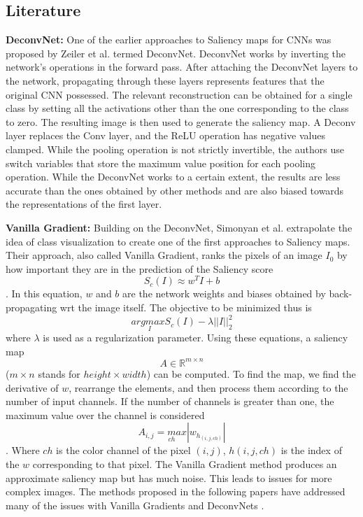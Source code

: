 \subsection{Literature}
\textbf{DeconvNet: }
One of the earlier approaches to Saliency maps for CNNs was proposed by Zeiler et al. \cite{zeilerVisualizingUnderstandingConvolutional2013} termed DeconvNet. DeconvNet works by inverting the network's operations in the forward pass. After attaching the DeconvNet layers to the network, propagating through these layers represents features that the original CNN possessed. The relevant reconstruction can be obtained for a single class by setting all the activations other than the one corresponding to the class to zero. The resulting image is then used to generate the saliency map. A Deconv layer replaces the Conv layer, and the ReLU operation has negative values clamped. While the pooling operation is not strictly invertible, the authors use switch variables that store the maximum value position for each pooling operation. While the DeconvNet works to a certain extent, the results are less accurate than the ones obtained by other methods and are also biased towards the representations of the first layer.

\textbf{Vanilla Gradient: }
Building on the DeconvNet, Simonyan et al. \cite{simonyanDeepConvolutionalNetworks2014} extrapolate the idea of class visualization to create one of the first approaches to Saliency maps. Their approach, also called Vanilla Gradient, ranks the pixels of an image $I_{0}$ by how important they are in the prediction of the Saliency score $$S_{c}(I) \approx w^{T}I + b$$. In this equation, $w$ and $b$ are the network weights and biases obtained by back-propagating wrt the image itself. The objective to be minimized thus is $$arg \underset{I}max S_{c}(I) - \lambda||I||^{2}_{2}$$ where $\lambda$ is used as a regularization parameter. Using these equations, a saliency map $$A \in \mathbb{R}^{m \times n}$$ ($m \times n$ stands for $height \times width$) can be computed. To find the map, we find the derivative of $w$, rearrange the elements, and then process them according to the number of input channels. If the number of channels is greater than one, the maximum value over the channel is considered $$A_{i,j}= \underset{ch}max |w_{h_{(i,j, ch)}}|$$. Where $ch$ is the color channel of the pixel $(i,j)$, $h(i,j, ch)$ is the index of the $w$ corresponding to that pixel. The Vanilla Gradient method produces an approximate saliency map but has much noise. This leads to issues for more complex images. The methods proposed in the following papers have addressed many of the issues with Vanilla Gradients and DeconvNets \cite{zeilerVisualizingUnderstandingConvolutional2013}.

